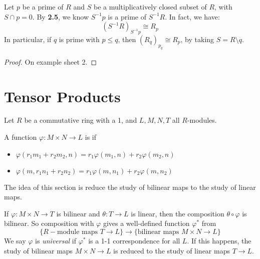\documentclass[10pt,a4paper]{article}
\begin{document}
\begin{lemma}
  Let $p$ be a prime of $R$ and $S$ be a multiplicatively closed subset of $R$, with $S\cap p = 0$. By \textbf{2.5}, we know $S^{-1}p$ is a prime of $S^{-1}R$. In fact, we have:
  \[(S^{-1}R)_{S^{-1}p} \cong R_p\]
  In particular, if $q$ is prime with $p \leq q$, then $(R_q)_{p_q} \cong R_p$, by taking $S = R\setminus q$.
\end{lemma}
\begin{proof}
  On example sheet 2.
\end{proof}
\section{Tensor Products}
Let $R$ be a commutative ring with a 1, and $L,M,N,T$ all $R$-modules.

\begin{definition}
  A function $\varphi:M \times N \to L$ is  if
  \begin{itemize}
    \item $\varphi(r_1m_1+r_2m_2, n) = r_1\varphi(m_1, n)+r_2\varphi(m_2, n)$
    \item $\varphi(m, r_1n_1+r_2n_2) = r_1\varphi(m, n_1)+r_2\varphi(m, n_2)$
  \end{itemize}
\end{definition}
The idea of this section is reduce the study of bilinear maps to the study of linear maps.

If $\varphi:M\times N \to T$ is bilinear and $\theta:T \to L$ is linear, then the composition $\theta\circ \varphi$ is bilinear. So composition with $\varphi$ gives a well-defined function $\varphi^{\ast}$ from
\[\{R-\text{module maps }T\to L\} \to \{\text{bilinear maps }M\times N \to L\}\]
We say $\varphi$ is \emph{universal} if $\varphi^\ast$ is a 1-1 correspondence for all $L$. If this happens, the study of bilinear maps $M \times N\to L$ is reduced to the study of linear maps $T \to L$.
\end{document}

